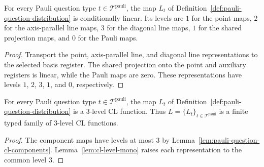 \begin{lemma}\label{lem:pauli-question-cl-components}
	\leanok
	For every Pauli question type $t \in \mathcal T^{\mathrm{pauli}}$, the map $L_t$ of Definition~\ref{def:pauli-question-distribution} is conditionally linear. Its levels are $1$ for the point maps, $2$ for the axis-parallel line maps, $3$ for the diagonal line maps, $1$ for the shared projection maps, and $0$ for the Pauli maps.
\end{lemma}
\begin{proof}
	\leanok
	Transport the point, axis-parallel line, and diagonal line representations to the selected basis register. The shared projection onto the point and auxiliary registers is linear, while the Pauli maps are zero. These representations have levels $1$, $2$, $3$, $1$, and $0$, respectively.
\end{proof}

\begin{lemma}\label{lem:pauli-question-cl-family}
	\leanok
	For every Pauli question type $t \in \mathcal T^{\mathrm{pauli}}$, the map $L_t$ of Definition~\ref{def:pauli-question-distribution} is a $3$-level CL function. Thus $L = \{L_t\}_{t \in \mathcal T^{\mathrm{pauli}}}$ is a finite typed family of $3$-level CL functions.
\end{lemma}
\begin{proof}
	\leanok
	The component maps have levels at most $3$ by Lemma~\ref{lem:pauli-question-cl-components}. Lemma~\ref{lem:cl-level-mono} raises each representation to the common level $3$.
\end{proof}

